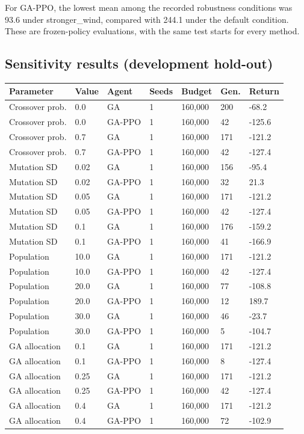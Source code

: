 \documentclass[11pt,a4paper]{article}
\begin{document}
For GA-PPO, the lowest mean among the recorded robustness conditions was 93.6 under stronger\_wind, compared with 244.1 under the default condition. These are frozen-policy evaluations, with the same test starts for every method.

\subsection*{Sensitivity results (development hold-out)}
\begingroup\small
\begin{longtable}{p{}p{}p{}p{}p{}p{}p{}}
\toprule
Parameter & Value & Agent & Seeds & Budget & Gen. & Return \\
\midrule\endhead
Crossover prob. & 0.0 & GA & 1 & 160,000 & 200 & -68.2 \\
Crossover prob. & 0.0 & GA-PPO & 1 & 160,000 & 42 & -125.6 \\
Crossover prob. & 0.7 & GA & 1 & 160,000 & 171 & -121.2 \\
Crossover prob. & 0.7 & GA-PPO & 1 & 160,000 & 42 & -127.4 \\
Mutation SD & 0.02 & GA & 1 & 160,000 & 156 & -95.4 \\
Mutation SD & 0.02 & GA-PPO & 1 & 160,000 & 32 & 21.3 \\
Mutation SD & 0.05 & GA & 1 & 160,000 & 171 & -121.2 \\
Mutation SD & 0.05 & GA-PPO & 1 & 160,000 & 42 & -127.4 \\
Mutation SD & 0.1 & GA & 1 & 160,000 & 176 & -159.2 \\
Mutation SD & 0.1 & GA-PPO & 1 & 160,000 & 41 & -166.9 \\
Population & 10.0 & GA & 1 & 160,000 & 171 & -121.2 \\
Population & 10.0 & GA-PPO & 1 & 160,000 & 42 & -127.4 \\
Population & 20.0 & GA & 1 & 160,000 & 77 & -108.8 \\
Population & 20.0 & GA-PPO & 1 & 160,000 & 12 & 189.7 \\
Population & 30.0 & GA & 1 & 160,000 & 46 & -23.7 \\
Population & 30.0 & GA-PPO & 1 & 160,000 & 5 & -104.7 \\
GA allocation & 0.1 & GA & 1 & 160,000 & 171 & -121.2 \\
GA allocation & 0.1 & GA-PPO & 1 & 160,000 & 8 & -127.4 \\
GA allocation & 0.25 & GA & 1 & 160,000 & 171 & -121.2 \\
GA allocation & 0.25 & GA-PPO & 1 & 160,000 & 42 & -127.4 \\
GA allocation & 0.4 & GA & 1 & 160,000 & 171 & -121.2 \\
GA allocation & 0.4 & GA-PPO & 1 & 160,000 & 72 & -102.9 \\
\bottomrule\end{longtable}
\endgroup
\end{document}
